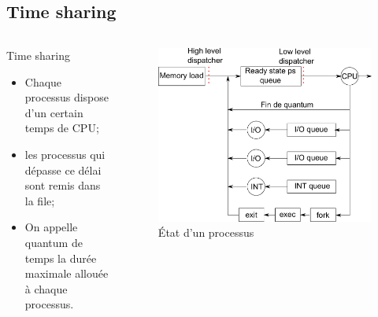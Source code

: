 \section{\sectitle}
\begin{frame}{\sectitle}
\def\subsectitle{Time sharing}
\subsection{\subsectitle}

\begin{columns}[c]
\begin{block}{\subsectitle}
\begin{itemize}
    \item Chaque processus dispose d'un certain temps de CPU;
    \item les processus qui dépasse ce délai sont remis dans la file;
    \item On appelle quantum de temps la durée maximale allouée à chaque
    processus.
\end{itemize}
\end{block}

\begin{figure}
\includegraphics[width=\textwidth]{images/timesharingDispatching.pdf}
\caption{État d'un processus}
\end{figure}
\end{columns}

\end{frame}


